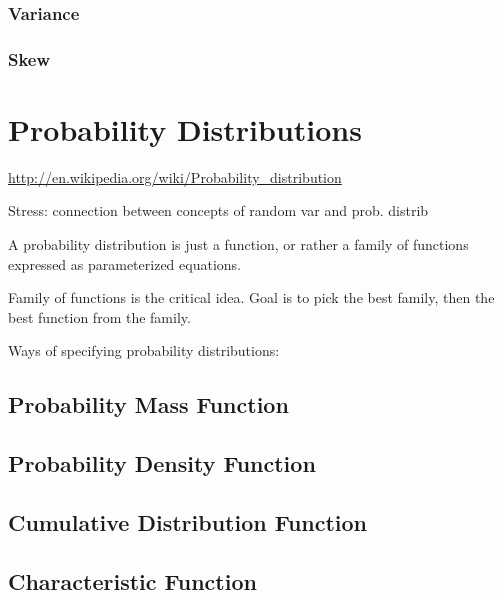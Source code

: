 \subsection{Variance}

\subsection{Skew}

\chapter{Probability Distributions}

\url{http://en.wikipedia.org/wiki/Probability_distribution}


\begin{remark}
  Stress: connection between concepts of random var and prob. distrib
\end{remark}

A probability distribution is just a function, or rather a family of
functions expressed as parameterized equations.

\begin{remark}
  Family of functions is the critical idea.  Goal is to pick the best
  family, then the best function from the family.
\end{remark}

Ways of specifying probability distributions:

\section{Probability Mass Function}


\section{Probability Density Function}

\section{Cumulative Distribution Function}

\section{Characteristic Function}

